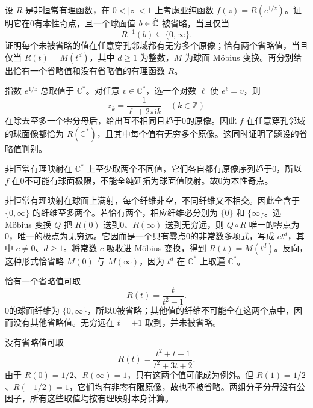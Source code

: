 \begin{exercise}\label{b3:ex:14-6}
设 \(R\) 是非恒常有理函数，在 \(0<|z|<1\) 上考虑亚纯函数 \(f(z)=R(e^{1/z})\)。证明它在0有本性奇点，且一个球面值 \(b\in\widehat{\mathbb C\kern0pt}\) 被省略，当且仅当
\[
 R^{-1}(b)\subseteq\{0,\infty\}.
\]
证明每个未被省略的值在任意穿孔邻域都有无穷多个原像；恰有两个省略值，当且仅当 \(R(t)=M(t^d)\)，其中 \(d\ge1\) 为整数，\(M\) 为球面 Möbius 变换。再分别给出恰有一个省略值和没有省略值的有理函数 \(R\)。
\end{exercise}
\begin{solution}
指数 \(e^{1/z}\) 总取值于 \(\mathbb C^*\)。对任意 \(v\in\mathbb C^*\)，选一个对数 \(\ell\) 使 \(e^\ell=v\)，则
\[
 z_k=\frac1{\ell+2\pi\mathrm i k}\quad(k\in\mathbb Z)
\]
在除去至多一个零分母后，给出互不相同且趋于0的原像。因此 \(f\) 在任意穿孔邻域的球面像都恰为 \(R(\mathbb C^*)\)，且其中每个值有无穷多个原像。这同时证明了题设的省略值判别。

非恒常有理映射在 \(\mathbb C^*\) 上至少取两个不同值，它们各自都有原像序列趋于0，所以 \(f\) 在0不可能有球面极限，不能全纯延拓为球面值映射。故0为本性奇点。

非恒常有理映射在球面上满射，每个纤维非空，不同纤维又不相交。因此全含于 \(\{0,\infty\}\) 的纤维至多两个。若恰有两个，相应纤维必分别为 \(\{0\}\) 和 \(\{\infty\}\)。选 Möbius 变换 \(Q\) 把 \(R(0)\) 送到0、\(R(\infty)\) 送到无穷远，则 \(Q\circ R\) 唯一的零点为0，唯一的极点为无穷远。它因而是一个只有零点0的非常数多项式，写成 \(ct^d\)，其中 \(c\ne0\)、\(d\ge1\)。将常数 \(c\) 吸收进 Möbius 变换，得到 \(R(t)=M(t^d)\)。反向，这种形式恰省略 \(M(0)\) 与 \(M(\infty)\)，因为 \(t^d\) 在 \(\mathbb C^*\) 上取遍 \(\mathbb C^*\)。

恰有一个省略值可取
\[
 R(t)=\frac{t}{t^2-1}.
\]
0的球面纤维为 \(\{0,\infty\}\)，所以0被省略；其他值的纤维不可能全在这两个点中，因而没有其他省略值。无穷远在 \(t=\pm1\) 取到，并未被省略。

没有省略值可取
\[
 R(t)=\frac{t^2+t+1}{t^2+3t+2}.
\]
由于 \(R(0)=1/2\)、\(R(\infty)=1\)，只有这两个值可能成为例外。但 \(R(1)=1/2\)、\(R(-1/2)=1\)，它们均有非零有限原像，故也不被省略。两组分子分母没有公因子，所有这些取值均按有理映射本身计算。
\end{solution}


